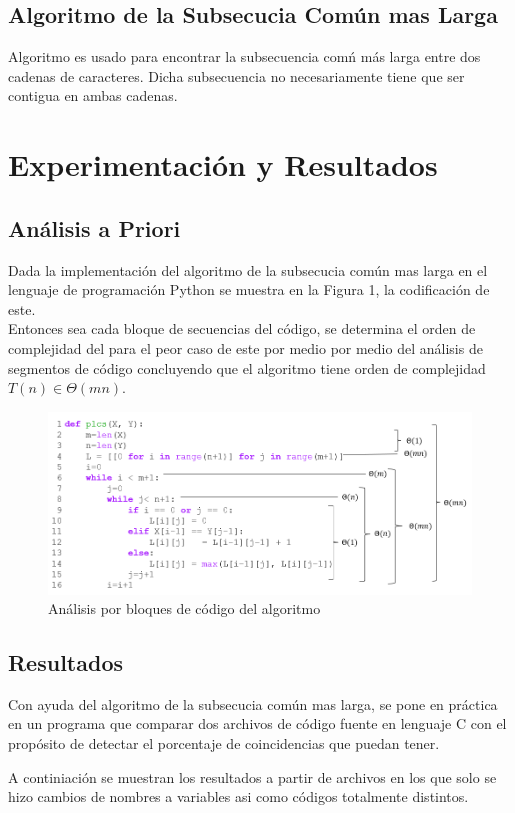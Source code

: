 \documentclass[12pt,twoside]{article}
\begin{document}
    \subsection{Algoritmo de la Subsecucia Común mas Larga}
        Algoritmo es usado para encontrar la subsecuencia com\'n m\'as larga entre dos cadenas de caracteres. Dicha subsecuencia no necesariamente tiene que ser contigua en ambas cadenas.
\newpage
\section{Experimentaci\'on y Resultados}
    \subsection{An\'alisis a Priori}
    Dada la implementaci\'on del algoritmo de la subsecucia com\'un mas larga en el lenguaje de programaci\'on Python se muestra en la Figura 1, la codificaci\'on de este.\\
    Entonces sea cada bloque de secuencias del c\'odigo, se determina el orden de complejidad del para el peor caso de este por medio por medio del an\'alisis de segmentos de c\'odigo concluyendo que el algoritmo tiene orden de complejidad $T(n)\in\Theta(mn)$.
    \begin{figure}[H]
        \centering
        \includegraphics[width=14cm]{imagenes/lcs.png}
        \caption{Análisis por bloques de c\'odigo del algoritmo}
    \end{figure}
    \subsection{Resultados}
    Con ayuda del algoritmo de la subsecucia com\'un mas larga, se pone en pr\'actica en un programa que comparar dos archivos de c\'odigo fuente en lenguaje C con el prop\'osito de detectar el porcentaje de coincidencias que puedan tener.
    
    A continiaci\'on se muestran los resultados a partir de archivos en los que solo se hizo cambios de nombres a variables asi como c\'odigos totalmente distintos.
    
\end{document}
